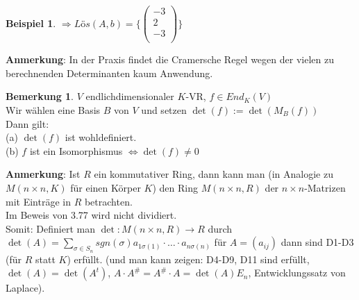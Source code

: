 \documentclass[10pt,a4paper,numbers=endperiod]{scrartcl}
\theoremstyle{definition}
\newtheorem{bem}[satz]{Bemerkung}
\newtheorem{bsp}[satz]{Beispiel}
\begin{document}
\begin{bsp}
	$\Rightarrow Lös(A,b) = \{ \begin{pmatrix}
	-3\\2\\-3\\
	\end{pmatrix}\}$
\end{bsp}

\textbf{Anmerkung}: In der Praxis findet die Cramersche Regel wegen der vielen zu berechnenden Determinanten kaum Anwendung. 

\begin{bem}
	$V$ endlichdimensionaler $K$-VR, $f \in End_K(V)$\\
	Wir wählen eine Basis $B$ von $V$ und setzen $\det(f) := \det(M_B(f))$\\
	Dann gilt:\\
	(a) $\det(f)$ ist wohldefiniert.\\
	(b) $f$ ist ein Isomorphismus $\Leftrightarrow \det(f) \neq 0$
\end{bem}
	
\textbf{Anmerkung}: Ist $R$ ein kommutativer Ring, dann kann man (in Analogie zu $M(n \times n, K )$ für einen Körper $K$) den Ring $M(n \times n, R)$ der $n\times n$-Matrizen mit Einträge in $R$ betrachten.\\
Im Beweis von 3.77 wird nicht dividiert.\\
Somit: Definiert man $\det : M(n\times n, R) \rightarrow R$ durch $\det(A) = \sum\limits_{\sigma \in S_n}sgn(\sigma) a_{1\sigma(1)} \cdot \ldots \cdot a_{n\sigma(n)}$ für $A = (a_{ij})$ dann sind D1-D3 (für $R$ statt $K$) erfüllt. (und man kann zeigen: D4-D9, D11 sind erfüllt, $\det(A) = \det(A^t)$, $A\cdot A^\# = A^\# \cdot A = \det(A) E_n$, Entwicklungssatz von Laplace). 
\end{document}
